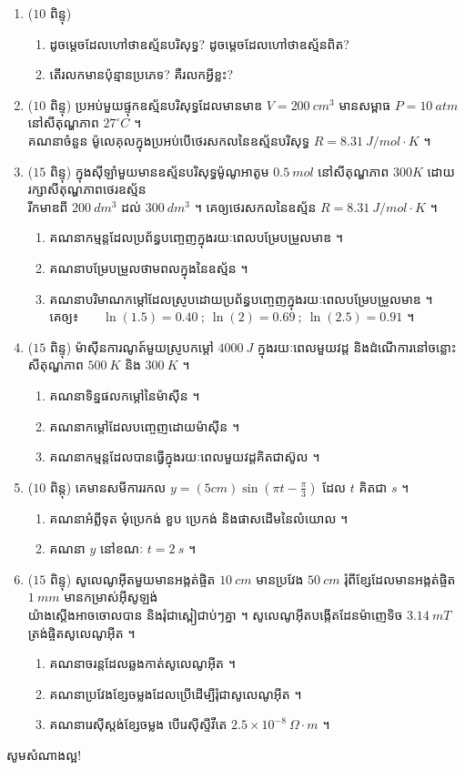 \documentclass[a4paper, 12pt]{exam}
\begin{document}
\begin{enumerate}[I]
	\item ($10$ ពិន្ទុ)
	\begin{enumerate}[1]
		\item ដូចម្ដេចដែលហៅថាឧស្ម័នបរិសុទ្ធ? ដូចម្តេចដែលហៅថាឧស្ម័នពិត?
		\item តើរលកមានប៉ុន្មានប្រភេទ? គឺរលកអ្វីខ្លះ?
	\end{enumerate}
	\item ($10$ ពិន្ទុ) ប្រអប់មួយផ្ទុកឧស្ម័នបរិសុទ្ធដែលមានមាឌ $V=200~cm^3$ មានសម្ពាធ $P=10~atm$ នៅសីតុណ្ហភាព $27^\circ C$ ។\\
	គណនាចំនួន ម៉ូលេគុលក្នុងប្រអប់បើថេរសកលនៃឧស្ម័នបរិសុទ្ធ $R=8.31~J/mol\cdot K$ ។
	\item($15$ ពិន្ទុ) ក្នុងស៊ីឡាំមួយមានឧស្ម័នបរិសុទ្ធម៉ូណូអាតូម $0.5~mol$ នៅសីតុណ្ហភាព $300K$ ដោយរក្សាសីតុណ្ហភាពថេរឧស្ម័ន\\រីកមាឌពី $200~dm^3$ ដល់ $300~dm^3$ ។ គេឲ្យថេរសកលនៃឧស្ម័ន $R=8.31~J/mol\cdot K$ ។
	\begin{enumerate}[a]
		\item គណនាកម្មន្តដែលប្រព័ន្ធបញ្ចេញក្នុងរយៈពេលបម្រែបម្រួលមាឌ ។
		\item គណនាបម្រែបម្រួលថាមពលក្នុងនៃឧស្ម័ន ។
		\item គណនាបរិមាណកម្ដៅដែលស្រូបដោយប្រព័ន្ធបញ្ចេញក្នុងរយៈពេលបម្រែបម្រួលមាឌ ។\\
		គេឲ្យ៖~~~ $\ln(1.5)=0.40~;~\ln(2)=0.69~;~\ln(2.5)=0.91$ ។
	\end{enumerate}
	\item($15$ ពិន្ទុ) ម៉ាស៊ីនការណូត៍មួយស្រូបកម្តៅ $4000~J$ ក្នុងរយៈពេលមួយវដ្ត និងដំណើការនៅចន្លោះសីតុណ្ហភាព $500~K$ និង $300~K$ ។
	\begin{enumerate}[a]
		\item គណនាទិន្នផលកម្តៅនៃម៉ាស៊ីន ។
		\item គណនាកម្តៅដែលបញ្ចេញដោយម៉ាស៊ីន ។
		\item គណនាកម្មន្តដែលបានធ្វើក្នុងរយៈពេលមួយវដ្តគិតជាស៊ូល ។
	\end{enumerate}
	\item ($10$ ពិន្តុ) គេមានសមីការរកល $y=(5cm)\sin(\pi t-\frac{\pi}{3})$ ដែល $t$ គិតជា $s$ ។
	\begin{enumerate}[a]
		\item គណនាអំព្លីទុត មុំប្រេកង់ ខួប ប្រេកង់ និងផាសដើមនៃលំយោល ។
		\item គណនា $y$ នៅខណៈ $t=2~s$ ។
	\end{enumerate}
	\item($15$ ពិន្ទុ) សូលេណូអ៊ីតមួយមានអង្កត់ផ្ចិត $10~cm$ មានប្រវែង $50~cm$ រុំពីខ្សែដែលមានអង្កត់ផ្ចិត $1~mm$ មានកម្រាស់អ៊ីសូឡង់\\យ៉ាងស្តើងអាចចោលបាន និងរុំជាស្ពៀជាប់ៗគ្នា ។ សូលេណូអ៊ីតបង្កើតដែនម៉ាញេទិច $3.14~mT$ \\ត្រង់ផ្ចិតសូលេណូអ៊ីត ។
	\begin{enumerate}[a]
		\item គណនាចរន្តដែលឆ្លងកាត់សូលេណូអ៊ីត ។
		\item គណនាប្រវែងខ្សែចម្លងដែលប្រើដើម្បីរុំជាសូលេណូអ៊ីត ។
		\item គណនារេស៊ីស្តង់ខ្សែចម្លង បើរេស៊ីស្ទីវីតេ $2.5\times10^{-8}~\Omega\cdot m$ ។
	\end{enumerate}
\end{enumerate}
\begin{center}
	\sffamily\color{black}
	សូមសំណាងល្អ!
\end{center}\newpage
\end{document}
